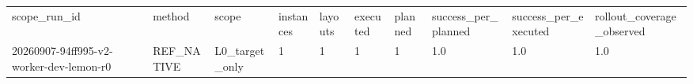 \begin{tabular}{llllllllll}
scope\_run\_id & method & scope & instances & layouts & executed & planned & success\_per\_planned & success\_per\_executed & rollout\_coverage\_observed \\
20260907-94ff995-v2-worker-dev-lemon-r0 & REF\_NATIVE & L0\_target\_only & 1 & 1 & 1 & 1 & 1.0 & 1.0 & 1.0 \\
\end{tabular}
